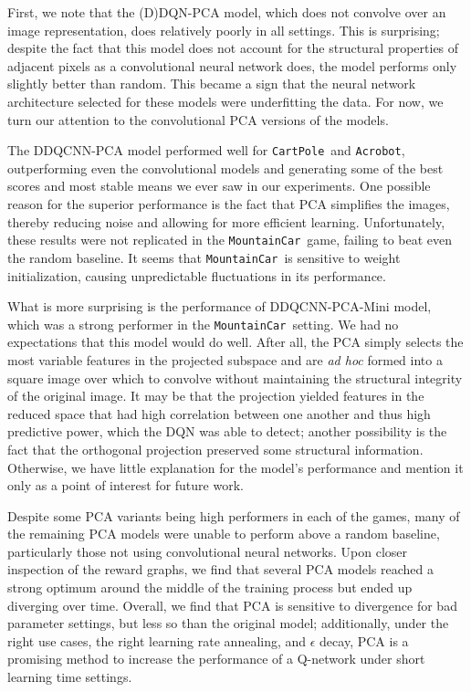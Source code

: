 \documentclass[11pt]{article}
\newcommand{\cp}{\texttt{CartPole}}
\newcommand{\ab}{\texttt{Acrobot}}
\newcommand{\mc}{\texttt{MountainCar}}
\begin{document}
First, we note that the (D)DQN-PCA model, which does not convolve over an image representation, does relatively poorly in all settings. This is surprising; despite the fact that this model does not account for the structural properties of adjacent pixels as a convolutional neural network does, the model performs only slightly better than random. This became a sign that the neural network architecture selected for these models were underfitting the data. For now, we turn our attention to the convolutional PCA versions of the models.

The DDQCNN-PCA model performed well for \cp~and \ab, outperforming even the convolutional models and generating some of the best scores and most stable means we ever saw in our experiments. One possible reason for the superior performance is the fact that PCA simplifies the images, thereby reducing noise and allowing for more efficient learning. Unfortunately, these results were not replicated in the \mc~game, failing to beat even the random baseline. It seems that \mc~is sensitive to weight initialization, causing unpredictable fluctuations in its performance.

What is more surprising is the performance of DDQCNN-PCA-Mini model, which was a strong performer in the \mc~setting. We had no expectations that this model would do well. After all, the PCA simply selects the most variable features in the projected subspace and are \textit{ad hoc} formed into a square image over which to convolve without maintaining the structural integrity of the original image. It may be that the projection yielded features in the reduced space that had high correlation between one another and thus high predictive power, which the DQN was able to detect; another possibility is the fact that the orthogonal projection preserved some structural information. Otherwise, we have little explanation for the model's performance and mention it only as a point of interest for future work. 

Despite some PCA variants being high performers in each of the games, many of the remaining PCA models were unable to perform above a random baseline, particularly those not using convolutional neural networks. Upon closer inspection of the reward graphs, we find that several PCA models reached a strong optimum around the middle of the training process but ended up diverging over time. Overall, we find that PCA is sensitive to divergence for bad parameter settings, but less so than the original model; additionally, under the right use cases, the right learning rate annealing, and $\epsilon$ decay, PCA is a promising method to increase the performance of a Q-network under short learning time settings.
\end{document}

